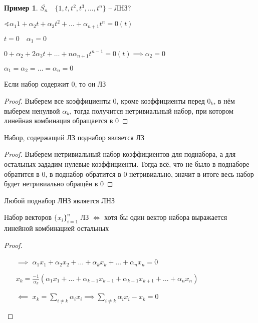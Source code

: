 \documentclass{book}
\theoremstyle{definition}
\newtheorem*{example}{Пример}
\begin{document}
\begin{example}
    $\overline{S_n}\quad \{1, t, t^2, t^3, \ldots, t^n\}$ -- ЛНЗ?

    $\sphericalangle \alpha_1 1 + \alpha_2t + \alpha_3t^2 + \ldots + \alpha_{n+1}t^n = 0(t)$

    $t=0\quad \alpha_1 = 0$

    $0+\alpha_2 + 2\alpha_3 t + \ldots + n\alpha_{n+1}t^{n-1} = 0(t) \implies \alpha_2 = 0$

    $\alpha_1 = \alpha_2 = \ldots = \alpha_n = 0$
\end{example}
\begin{lemma}
    Если набор содержит $0$, то он ЛЗ
\end{lemma}
\begin{proof}
    Выберем все коэффициенты $0$, кроме коэффициенты перед $0_k$, в нём выберем ненулвой  $\alpha_k$, тогда получится нетривиальный набор, при котором линейная комбинация обращается в  $0$
\end{proof}
\begin{lemma}
    Набор, содержащий ЛЗ поднабор является ЛЗ
\end{lemma}
\begin{proof}
    Выберем нетривиальный набор коэффициентов для поднабора, а для остальных зададим нулевые коэффициенты. Тогда всё, что не было в поднаборе обратится в $0$, в поднабор обратится в 0 нетривиально, значит в итоге весь набор будет нетривиально обращён в  $0$
\end{proof}
 \begin{lemma}
     Любой поднабор ЛНЗ является ЛНЗ
 \end{lemma}
 
 \begin{theorem}
     Набор векторов $\{x_i\}_{i=1}^n$ ЛЗ  $\iff $ хотя бы один вектор набора выражается линейной комбинацией остальных
 \end{theorem}
 \begin{proof}
     \begin{itemize}
         \item []
         \item [$\implies $] $\alpha_1x_1 + \alpha_2x_2 + \ldots + \alpha_kx_k + \ldots + \alpha_nx_n = 0$

             $x_k = \frac{-1}{\alpha_k}\left( \alpha_1x_1 + \ldots + \alpha_{k-1}x_{k-1} + \alpha_{k+1}x_{k+1} + \ldots + \alpha_nx_n \right) $ 
         \item [$\impliedby $] $x_k = \sum_{i\neq k} \alpha_ix_i \implies  \sum_{i\neq k} \alpha_ix_i - x_k = 0$
     \end{itemize}
 \end{proof}
\end{document}
